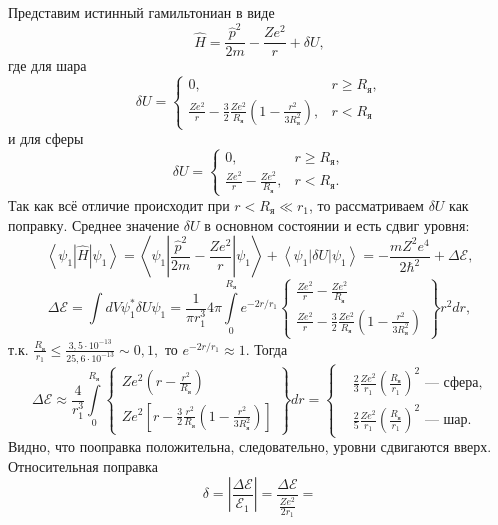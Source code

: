 \documentclass[a4paper]{article}
\begin{document}
\begin{sol}
Представим истинный гамильтониан в виде
\[
\hat{H}= \frac{\hat{p}^2}{2m}- \frac{Ze^2}{r}+ \delta U
,\] 
где для шара
\[
\delta U = \begin{cases}
	0,& r \ge R_\text{я},\\
	\frac{Z e^2}{r}- \frac{3}{2} \frac{Z e^2}{R_\text{я}}
	\left( 1- \frac{r^2}{3 R_\text{я}^2} \right) ,& r<R_\text{я}
\end{cases}
\] 
и для сферы
\[
\delta U = \begin{cases}
	0, & r \ge R_\text{я},\\
	\frac{Ze^2}{r}- \frac{Z e^2}{R_\text{я}}, & r<R_\text{я}.
\end{cases}
\]
Так как всё отличие происходит при $r <R_\text{я}\ll r_1$, то 
рассматриваем $\delta U$ как поправку. Среднее значение $\delta U$ в
основном состоянии и есть сдвиг уровня:
\[
\left< \psi_1  \left| \hat{H} \right|  \psi_1 \right> =  
\left< \psi_1 \left| \frac{\hat{p}^2}{2m}- \frac{Z e^2}{r} \right| \psi_1 \right>+ \left<\psi_1 \left| \delta U \right| \psi_1 \right>= 
- \frac{m Z^2 e^4}{2 \hbar^2} +\Delta \mathcal{E}
 ,\]
\[
	\Delta \mathcal{E} = \int dV \psi_1^* \delta U \psi_1 =
	\frac{1}{\pi r_1^3} 4 \pi \int\limits_{0}^{R_\text{я}} 
	e^{-2r /r_1} 
	\left\{
	\begin{gathered}
	\frac{Ze^2}{r}- \frac{Ze^2}{R_{\text{я}}}\\
	\frac{Ze^2}{r} - \frac{3}{2} \frac{Ze^2}{R_\text{я}} \left( 
	1 - \frac{r^2}{3 R_\text{я}^2}\right) 
	\end{gathered}
\right\}r^2 dr
 ,\] 
т.\:к. $\frac{R_\text{я}}{r_1}\le \frac{3,5 \cdot 10^{-13}}{25,6
\cdot 10 ^{-13}} \sim 0,1,$ то $e ^{- 2r /r_1} \approx 1$. Тогда
\[
	\Delta \mathcal{E} \approx 
	\frac{4}{r_1^3} \int\limits_{0}^{R_{\text{я}}} 
	\left\{
	\begin{gathered}
		Ze^2 \left( r - \frac{r^2}{R_{\text{я}}} \right) \\
		Ze^2 \left[ r - \frac{3}{2} \frac{r^2}{R_\text{я}}
		\left( 1- \frac{r^2}{3 R_\text{я}^2} \right) \right] 
	\end{gathered}
\right\} dr=
\left\{
\begin{aligned}
	&\frac{2}{3} \frac{Ze^2}{r_1} \left( \frac{R_\text{я}}{r_1} \right) ^2 \text{ --- сфера,}\\
	&\frac{2}{5} \frac{Ze^2}{r_1} \left( \frac{R_\text{я}}{r_1} \right) ^2 \text{ --- шар.}
\end{aligned}
\right.
\] 
Видно, что пооправка положительна, следовательно,
уровни сдвигаются вверх. Относительная поправка
\[
	\delta = \left| \frac{\Delta \mathcal{E}}{\mathcal{E}_1} \right| = \frac{\Delta \mathcal{E}}{\frac{Z e^2}{2 r_1}}=
\]
\end{sol}
\end{document}
